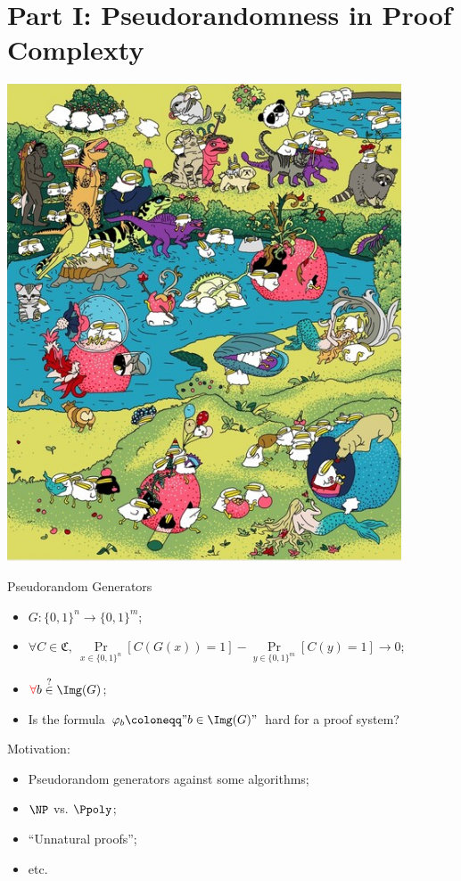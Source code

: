 \section{Part I: Pseudorandomness in Proof Complexty}

\begin{frame}
    \centering
    \insertsectionhead

    \vspace{0.3cm}
    \includegraphics[scale = 0.3]{pics/utia-garden.png}
\end{frame}

\begin{frame}{Pseudorandom Generators}

    \begin{itemize}
        \item $G\colon \{0, 1\}^n \to \{0, 1\}^m$;
            \pause
        \item $\forall C \in \mathfrak{C}, ~ \Pr\limits_{x \in \{0, 1\}^n}[C(G(x)) = 1] - \Pr\limits_{y
            \in \{0, 1\}^m}[C(y) = 1]
            \to 0$;
            \pause
        \item $\textcolor{red}{\forall}b \stackrel{?}{\in} \Img(G)$;
            \pause
        \item Is the formula $\varphi_b \coloneqq "b \in \Img(G)"$ hard for a proof system?          
    \end{itemize}

    \pause
    \vspace{0.3cm}
    Motivation:
    \begin{itemize}
        \item Pseudorandom generators against some algorithms;
        \item $\NP$ vs. $\Ppoly$;
        \item ``Unnatural proofs'';
        \item etc. 
    \end{itemize}
\end{frame}


